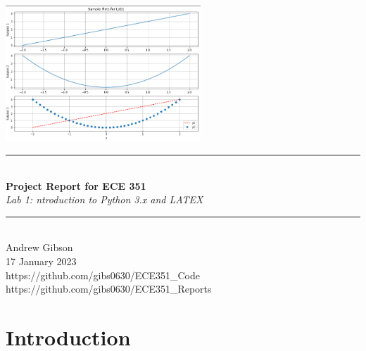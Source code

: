 \documentclass[12pt,a4paper]{article}
\newcommand{\HRule}{\rule{\linewidth}{0.5mm}}
\begin{document}
\begin{titlepage}
\begin{center}
\includegraphics[width=0.55\textwidth]{titlepage_image.png}~\\[2cm]
\HRule \\[0.4cm]
{ \LARGE 
  \textbf{Project Report for ECE 351}\\[0.4cm]
  \emph{Lab 1: ntroduction to Python 3.x and LATEX}\\[0.4cm]
}
\HRule \\[1.5cm]
{ \large
  Andrew Gibson \\[0.1cm]
  17 January 2023\\[0.1cm]
  https://github.com/gibs0630/ECE351\_Code\\[0.1cm]
  https://github.com/gibs0630/ECE351\_Reports\\[0.1cm]
}
\vfill
{\large }
 
\end{center}
\end{titlepage}
\newpage
\tableofcontents
{}
\newpage
\setcounter{page}{1}
\section{Introduction}\label{sec:intro}
\end{document}
